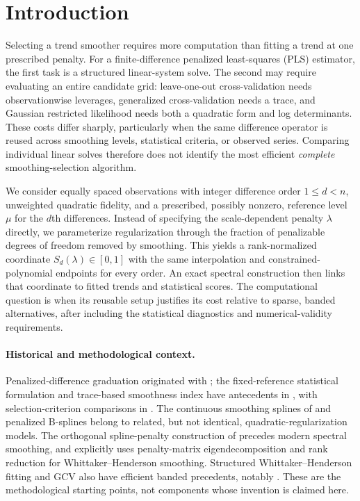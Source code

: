 \section{Introduction}\label{sec:introduction}

Selecting a trend smoother requires more computation than fitting a
trend at one prescribed penalty.  For a finite-difference penalized
least-squares (PLS) estimator, the first task is a structured
linear-system solve.  The second may require evaluating an entire
candidate grid: leave-one-out cross-validation needs observationwise
leverages, generalized cross-validation needs a trace, and
Gaussian restricted likelihood needs both a quadratic form and
log determinants.  These costs differ sharply, particularly when the
same difference operator is reused across smoothing levels,
statistical criteria, or observed series.  Comparing individual
linear solves therefore does not identify the most efficient
\emph{complete} smoothing-selection algorithm.

We consider equally spaced observations with integer difference
order $1\le d<n$, unweighted quadratic fidelity, and a prescribed,
possibly nonzero, reference level $\mu$ for the $d$th differences.
Instead of specifying the scale-dependent penalty $\lambda$ directly,
we parameterize regularization through the fraction of penalizable
degrees of freedom removed by smoothing.  This yields a
rank-normalized coordinate $S_d(\lambda)\in[0,1]$ with the same
interpolation and constrained-polynomial endpoints for every order.
An exact spectral construction then links that coordinate to
fitted trends and statistical scores.  The computational question is
when its reusable setup justifies its cost relative to sparse,
banded alternatives, after including the statistical diagnostics
and numerical-validity requirements.

\paragraph{Historical and methodological context.}
Penalized-difference graduation originated with
\citet{bohlmann1899,whittaker1923,henderson1925}; the
fixed-reference statistical formulation and trace-based smoothness
index have antecedents in \citet{guerrero2007,guerrero2008}, with
selection-criterion comparisons in \citet{cortes2017}.
The continuous smoothing splines of \citet{reinsch1967} and
penalized B-splines \citep{eilersmarx1996} belong to related,
but not identical, quadratic-regularization models.
The orthogonal spline-penalty construction of
\citet{demmler1975} precedes modern spectral smoothing,
and \citet[Sec.~6.4]{biessy2026} explicitly uses
penalty-matrix eigendecomposition and rank reduction
for Whittaker--Henderson smoothing.  Structured
Whittaker--Henderson fitting and GCV also have
efficient banded precedents, notably \citet{weinert2007}.
These are the methodological starting points, not
components whose invention is claimed here.

